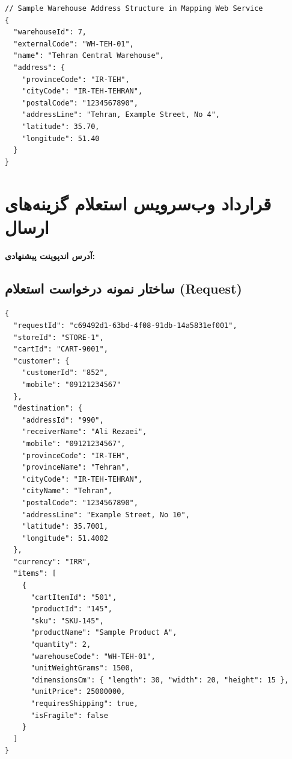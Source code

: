 \documentclass[11pt,a4paper]{article}
\begin{document}
\begin{latin}
\begin{verbatim}
// Sample Warehouse Address Structure in Mapping Web Service
{
  "warehouseId": 7,
  "externalCode": "WH-TEH-01",
  "name": "Tehran Central Warehouse",
  "address": {
    "provinceCode": "IR-TEH",
    "cityCode": "IR-TEH-TEHRAN",
    "postalCode": "1234567890",
    "addressLine": "Tehran, Example Street, No 4",
    "latitude": 35.70,
    "longitude": 51.40
  }
}
\end{verbatim}
\end{latin}

\section{قرارداد وب‌سرویس استعلام گزینه‌های ارسال}
\noindent \textbf{آدرس اندپوینت پیشنهادی:} 

\subsection{ساختار نمونه درخواست استعلام (Request)}
\begin{latin}
\begin{verbatim}
{
  "requestId": "c69492d1-63bd-4f08-91db-14a5831ef001",
  "storeId": "STORE-1",
  "cartId": "CART-9001",
  "customer": {
    "customerId": "852",
    "mobile": "09121234567"
  },
  "destination": {
    "addressId": "990",
    "receiverName": "Ali Rezaei",
    "mobile": "09121234567",
    "provinceCode": "IR-TEH",
    "provinceName": "Tehran",
    "cityCode": "IR-TEH-TEHRAN",
    "cityName": "Tehran",
    "postalCode": "1234567890",
    "addressLine": "Example Street, No 10",
    "latitude": 35.7001,
    "longitude": 51.4002
  },
  "currency": "IRR",
  "items": [
    {
      "cartItemId": "501",
      "productId": "145",
      "sku": "SKU-145",
      "productName": "Sample Product A",
      "quantity": 2,
      "warehouseCode": "WH-TEH-01",
      "unitWeightGrams": 1500,
      "dimensionsCm": { "length": 30, "width": 20, "height": 15 },
      "unitPrice": 25000000,
      "requiresShipping": true,
      "isFragile": false
    }
  ]
}
\end{verbatim}
\end{latin}
\end{document}
